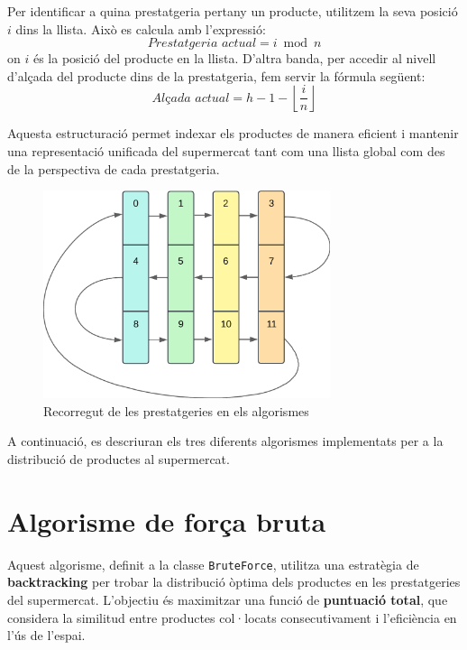 \documentclass[a4paper,12pt]{report}
\begin{document}
\begin{itemize}
Per identificar a quina prestatgeria pertany un producte, utilitzem la seva posició \( i \) dins la llista. Això es calcula amb l'expressió:
\[
	\textit{Prestatgeria actual} = i \bmod n
\]
on \( i \) és la posició del producte en la llista.
\newline
D'altra banda, per accedir al nivell d'alçada del producte dins de la prestatgeria, fem servir la fórmula següent:
\[
	\textit{Alçada actual} = h - 1 - \left\lfloor \frac{i}{n} \right\rfloor
\]

Aquesta estructuració permet indexar els productes de manera eficient i mantenir una representació unificada del supermercat tant com una llista global com des de la perspectiva de cada prestatgeria.


\begin{figure}[H]
	\centering
	\includegraphics[width=0.75\textwidth]{../assets/shelvingUnit_array_diagram.png}
	\caption{Recorregut de les prestatgeries en els algorismes}
	\label{fig:shelving_array}
\end{figure}

A continuació, es descriuran els tres diferents algorismes implementats per a la distribució de productes al supermercat.

\section{Algorisme de força bruta}

Aquest algorisme, definit a la classe \texttt{BruteForce}, utilitza una estratègia de \textbf{backtracking} per trobar la distribució òptima dels productes en les prestatgeries del supermercat. L'objectiu és maximitzar una funció de \textbf{puntuació total}, que considera la similitud entre productes col·locats consecutivament i l'eficiència en l'ús de l'espai.


\end{itemize}
\end{document}
